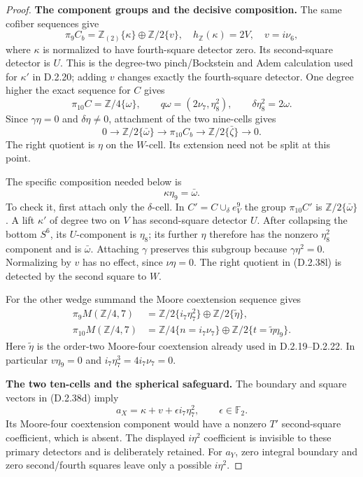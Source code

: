 \begin{proof}
\medskip\noindent
\textbf{The component groups and the decisive composition.}
The same cofiber sequences give
\[
 \pi_9 C_b=\mathbb Z_{(2)}\{\kappa\}\oplus\mathbb Z/2\{v\},
 \quad h_{\mathbb Z}(\kappa)=2V,
 \quad v=i\nu_6,
 \tag{D.2.38j}
\]
where $\kappa$ is normalized to have fourth-square detector zero.
Its second-square detector is $U$.  This is the degree-two
pinch/Bockstein and Adem calculation used for $\kappa'$ in
D.2.20; adding $v$ changes exactly the fourth-square detector.
One degree higher the exact sequence for $C$ gives
\[
 \pi_{10}C=\mathbb Z/4\{\omega\},\qquad
 q\omega=(2\nu_7,\eta_8^2),\qquad
 \delta\eta_8^2=2\omega.
 \tag{D.2.38k}
\]
Since $\gamma\eta=0$ and $\delta\eta\ne0$, attachment of
the two nine-cells gives
\[
 0\longrightarrow\mathbb Z/2\{\bar\omega\}
 \longrightarrow\pi_{10}C_b
 \longrightarrow\mathbb Z/2\{\bar\zeta\}
 \longrightarrow0.
 \tag{D.2.38l}
\]
The right quotient is $\eta$ on the $W$-cell.  Its extension
need not be split at this point.

The specific composition needed below is
\[
 \kappa\eta_9=\bar\omega.
 \tag{D.2.38m}
\]
To check it, first attach only the $\delta$-cell.
In $C'=C\cup_\delta e^9_V$ the group $\pi_{10}C'$ is
$\mathbb Z/2\{\bar\omega\}$.  A lift $\kappa'$ of degree
two on $V$ has second-square detector $U$.
After collapsing the bottom $S^6$, its $U$-component is $\eta_8$;
its further $\eta$ therefore has the nonzero $\eta_8^2$ component
and is $\bar\omega$.  Attaching $\gamma$ preserves this subgroup
because $\gamma\eta^2=0$.  Normalizing by $v$ has no effect,
since $\nu\eta=0$.  The right quotient in
\textup{(D.2.38l)} is detected by the second square to $W$.

For the other wedge summand the Moore coextension sequence gives
\[
\begin{split}
 \pi_9 M(\mathbb Z/4,7)
   &=\mathbb Z/2\{i_7\eta_7^2\}
      \oplus\mathbb Z/2\{\widetilde\eta\},\\
 \pi_{10} M(\mathbb Z/4,7)
   &=\mathbb Z/4\{n=i_7\nu_7\}
      \oplus\mathbb Z/2\{t=\widetilde\eta\eta_9\}.
\end{split}
\tag{D.2.38n}
\]
Here $\widetilde\eta$ is the order-two Moore-four coextension
already used in D.2.19--D.2.22.  In particular
$v\eta_9=0$ and $i_7\eta_7^3=4i_7\nu_7=0$.

\medskip\noindent
\textbf{The two ten-cells and the spherical safeguard.}
The boundary and square vectors in \textup{(D.2.38d)} imply
\[
 a_X=\kappa+v+\epsilon i_7\eta_7^2,
 \qquad \epsilon\in\mathbb F_2.
 \tag{D.2.38o}
\]
Its Moore-four coextension component would have a nonzero
$T'$ second-square coefficient, which is absent.  The displayed
$i\eta^2$ coefficient is invisible to these primary detectors
and is deliberately retained.  For $a_Y$, zero integral boundary
and zero second/fourth squares leave only a possible $i\eta^2$.


\end{proof}
